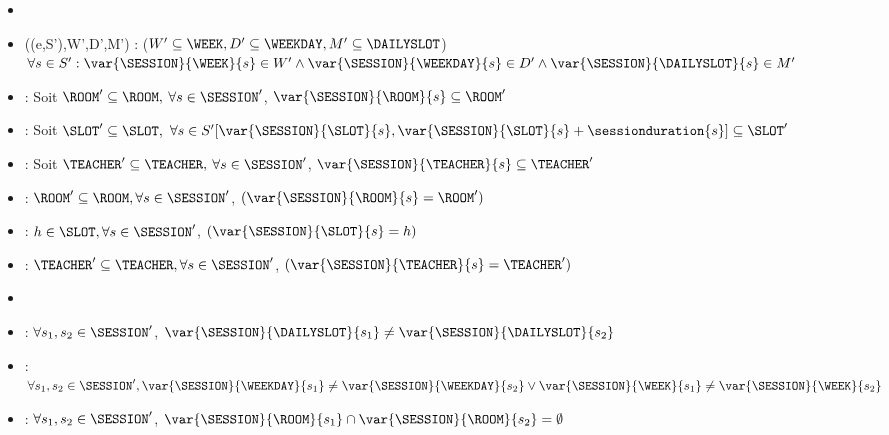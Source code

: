  \begin{itemize}
      \item \ADJACENTROOMS
      \item \ALLOWEDGRIDS((e,S'),W',D',M') : ($W'\subseteq \WEEK, D'\subseteq\WEEKDAY, M'\subseteq\DAILYSLOT$) $\forall s\in S': \var{\SESSION}{\WEEK}{s}\in W' \wedge   \var{\SESSION}{\WEEKDAY}{s}\in D' \wedge  \var{\SESSION}{\DAILYSLOT}{s}\in M'$
      
      
      \item \ALLOWEDROOMS : Soit  $\ROOM' \subseteq \ROOM,  $ $\forall s \in \SESSION'$, $\var{\SESSION}{\ROOM}{s} \subseteq \ROOM'$
      
      \item \ALLOWEDSLOTS : Soit  $\SLOT' \subseteq \SLOT,  $
      $\forall s \in S' [\var{\SESSION}{\SLOT}{s},\var{\SESSION}{\SLOT}{s}+\sessionduration{s}] \subseteq \SLOT'$
      
      \item \ALLOWEDTEACHERS : Soit  $\TEACHER' \subseteq \TEACHER,  $ $\forall s \in \SESSION'$, $\var{\SESSION}{\TEACHER}{s} \subseteq \TEACHER'$
      
      \item \ASSIGNROOMS: $ \ROOM' \subseteq \ROOM	,  \forall s \in \SESSION'$, $(\var{\SESSION}{\ROOM}{s} = \ROOM' )$
      
      \item \ASSIGNSLOT : $ h \in \SLOT	,  \forall s \in \SESSION'$, $(\var{\SESSION}{\SLOT}{s} = h )$
      
      \item \ASSIGNTEACHERS  : $ \TEACHER' \subseteq \TEACHER	,  \forall s \in \SESSION'$, $(\var{\SESSION}{\TEACHER}{s} = \TEACHER' )$
      
      \item \COMPACTNESS {}
      
      \item \DIFFERENTDAILYSLOT : $\forall s_1, s_2 \in \SESSION'$, $\var{\SESSION}{\DAILYSLOT}{s_1}  \ne \var{\SESSION}{\DAILYSLOT}{s_2}$
      
      \item \DIFFERENTDAY :  $\forall s_1, s_2 \in \SESSION',\var{\SESSION}{\WEEKDAY}{s_1}  \ne \var{\SESSION}{\WEEKDAY}{s_2} \vee \var{\SESSION}{\WEEK}{s_1}  \ne \var{\SESSION}{\WEEK}{s_2} $%
      
      \item \DIFFERENTROOMS :  $\forall s_1, s_2 \in \SESSION'$, $\var{\SESSION}{\ROOM}{s_1}  \cap \var{\SESSION}{\ROOM}{s_2} = \emptyset	$
      

\end{itemize}
